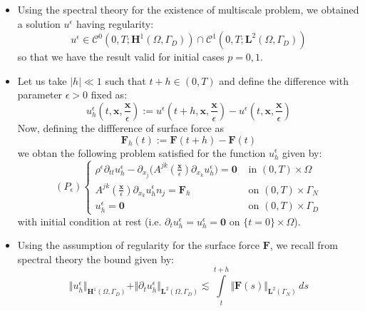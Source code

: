 \begin{itemize}
    \item Using the spectral theory for the existence of multiscale problem, we obtained a solution $u^{\epsilon}$ having regularity:
    \begin{equation*}
        u^{\epsilon} \in \mathcal{C}^0(0,T;\mathbf{H}^1(\Omega, \Gamma_D)) \cap \mathcal{C}^1(0,T;\mathbf{L}^2(\Omega, \Gamma_D))
    \end{equation*}
    so that we have the result valid for initial cases $p = 0, 1$.
    \item Let us take $\vert h \vert \ll 1$ such that $t+h \in (0,T)$ and define the difference with parameter $\epsilon > 0$ fixed as:
    \begin{equation*}
        u_h^{\epsilon}(t, \mathbf{x}, \frac{\mathbf{x}}{\epsilon}) := u^{\epsilon} (t+h, \mathbf{x}, \frac{\mathbf{x}}{\epsilon}) - u^{\epsilon}(t, \mathbf{x}, \frac{\mathbf{x}}{\epsilon})
    \end{equation*}
    Now, defining the diffference of surface force as
    \begin{equation*}
        \mathbf{F}_h(t):= \mathbf{F}(t+h) - \mathbf{F}(t)
    \end{equation*}
    we obtan the following problem satisfied for the function $u_h^{\epsilon}$ given by:
    \begin{equation*}
        (P_{\epsilon}) \left \{
        \begin{array}{cc}
            \rho^{\epsilon} \partial_{tt} u_h^{\epsilon} - \partial_{x_j} \big( A^{jk}(\frac{\mathbf{x}}{\epsilon}) \partial_{x_k} u_h^{\epsilon} \big) = \mathbf{0}  &  \text{ in } (0,T)\times \Omega \\
            A^{jk}(\frac{\mathbf{x}}{\epsilon}) \partial_{x_k} u_h^{\epsilon}n_j = \mathbf{F}_h & \text{ on } (0,T)\times \Gamma_N \\
            u^{\epsilon}_h = \mathbf{0} & \text{ on }(0,T)\times \Gamma_D
        \end{array}
        \right .
    \end{equation*}
    with initial condition at rest (i.e. $\partial_t u_h^{\epsilon} = u_h^{\epsilon} = \mathbf{0}$ on $\{t=0\} \times \Omega$).
    \item Using the assumption of regularity for the surface force $\mathbf{F}$, we recall from spectral theory the bound given by:
    \begin{equation*}
        \Vert u_h^{\epsilon} \Vert_{\mathbf{H}^1(\Omega, \Gamma_D)} + \Vert \partial_t u_h^{\epsilon}\Vert_{\mathbf{L}^2(\Omega, \Gamma_D)} \lesssim \int \limits_t^{t+h} \Vert \mathbf{F}(s) \Vert_{\mathbf{L}^2(\Gamma_N)} \, ds

\end{equation*}
\end{itemize}
